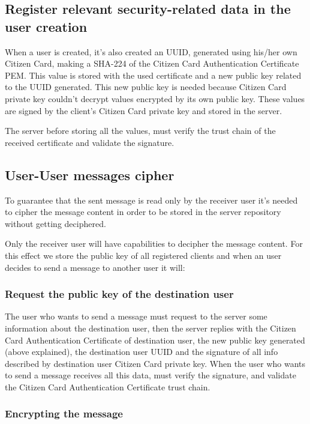 \documentclass[pdftex,12pt,a4paper]{report}
\begin{document}
\subsection{Register relevant security-related data in the user creation}

When a user is created, it's also created an UUID, generated using his/her own Citizen Card, making a SHA-224 of the Citizen Card Authentication Certificate PEM. This value is stored with the used certificate and a new public key related to the UUID generated. This new public key is needed because Citizen Card private key couldn't decrypt values encrypted by its own public key. These values are signed by the client's Citizen Card private key and stored in the server.

The server before storing all the values, must verify the trust chain of the received certificate and validate the signature.

\subsection{User-User messages cipher}

To guarantee that the sent message is read only by the receiver user it's needed to cipher the message content in order to be stored in the server repository without getting deciphered.

Only the receiver user will have capabilities to decipher the message content. For this effect we store the public key of all registered clients and when an user decides to send a message to another user it will:

\subsubsection{Request the public key of the destination user}

The user who wants to send a message must request to the server some information about the destination user, then the server replies with the Citizen Card Authentication Certificate of destination user, the new public key generated (above explained), the destination user UUID and the signature of all info described by destination user Citizen Card private key. When the user who wants to send a message receives all this data, must verify the signature, and validate the Citizen Card Authentication Certificate trust chain.

\subsubsection{Encrypting the message}
\end{document}
